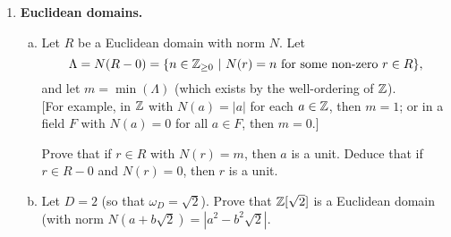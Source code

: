 \documentclass[11pt, reqno]{amsart}
\theoremstyle{plain}
\theoremstyle{definition}
\theoremstyle{example}
\begin{document}
\begin{enumerate}[1.]
\begin{enumerate}
\begin{enumerate}[(i)]
\item Let $I$ be an ideal that is maximal with respect to being nonprincipal, and let $a, b \in R$ with $ab \in I$ but $a, b \notin I$ (which exist because prime ideals are all principal, but $I$ is not principal and hence is not prime). Let $I_a = (I, a)$ and $I_b = (I, b)$, and define $J = \{ r\in R ~|~ rI_a \subseteq I\}$. 

\smallskip

Prove that $I_a$ and $I_b$ are principal, writing 
$$\text{$I_a = (\alpha)$ \quad and \quad $J = (\beta)$,}$$
and that they satisfy $I \subsetneq I_b \subseteq J$ and $I_a J = (\alpha \beta) \subseteq I$. 


\item If $x \in I$, show that $x = s\alpha$ for some $s \in J$. Deduce that $I = I_aJ$ is principal, a contradiction, and conclude that $R$ is a PID. 


\end{enumerate}
\end{enumerate}
\item \textbf{Euclidean domains.}
\begin{enumerate}[(a)]
\item Let $R$ be a Euclidean domain with norm $N$. Let 
$$\Lambda = N(R - 0) = \{n  \in \mathbb{Z}_{\ge 0} ~|~ N(r) = n \text{ for some non-zero } r \in R\},$$
and let $m = \min(\Lambda)$ (which exists by the well-ordering of $\mathbb{Z}$). \\
{\footnotesize [For example, in $\mathbb{Z}$ with $N(a) = |a|$ for each $a \in \mathbb{Z}$, then $m = 1$; or in a field $F$ with $N(a) = 0$ for all $a \in F$, then $m = 0$.]}

\smallskip

Prove that if $r \in R$ with $N(r) = m$, then $a$ is a unit. Deduce that if $r \in R - 0$ and $N(r) = 0$, then $r$ is a unit. 

\item Let $D = 2$ (so that $\omega_D = \sqrt{2}$). Prove that $\mathbb{Z}[\sqrt{2}]$ is a Euclidean domain (with norm $N(a + b\sqrt{2}) = |a^2 - b^2\sqrt{2}|$.
\end{enumerate}
\end{enumerate}
\end{document}

